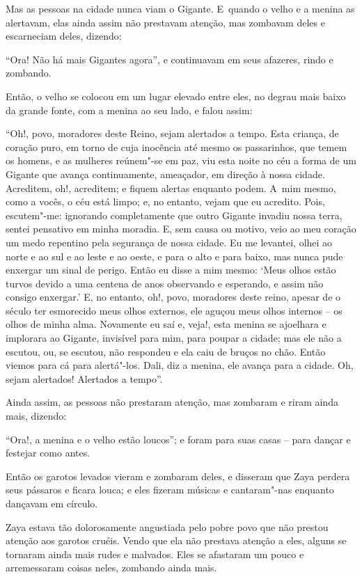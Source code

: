 Mas as pessoas na cidade nunca viam o Gigante. E~quando o velho e a
menina as alertavam, elas ainda assim não prestavam atenção, mas
zombavam deles e escarneciam deles, dizendo:

``Ora! Não há mais Gigantes agora'', e continuavam em seus afazeres,
rindo e zombando.

Então, o velho se colocou em um lugar elevado entre eles, no degrau mais
baixo da grande fonte, com a menina ao seu lado, e falou assim:

``Oh!, povo, moradores deste Reino, sejam alertados a tempo. Esta
criança, de coração puro, em torno de cuja inocência até mesmo os
passarinhos, que temem os homens, e as mulheres reúnem"-se em paz, viu
esta noite no céu a forma de um Gigante que avança continuamente,
ameaçador, em direção à nossa cidade. Acreditem, oh!, acreditem; e
fiquem alertas enquanto podem. A~mim mesmo, como a vocês, o céu está
limpo; e, no entanto, vejam que eu acredito. Pois, escutem"-me: ignorando
completamente que outro Gigante invadiu nossa terra, sentei pensativo em
minha moradia. E, sem causa ou motivo, veio ao meu coração um medo
repentino pela segurança de nossa cidade. Eu me levantei, olhei ao norte
e ao sul e ao leste e ao oeste, e para o alto e para baixo, mas nunca
pude enxergar um sinal de perigo. Então eu disse a mim mesmo: `Meus
olhos estão turvos devido a uma centena de anos observando e esperando,
e assim não consigo enxergar.' E, no entanto, oh!, povo, moradores deste
reino, apesar de o século ter esmorecido meus olhos externos, ele aguçou
meus olhos internos -- os olhos de minha alma. Novamente eu saí e,
veja!, esta menina se ajoelhara e implorara ao Gigante, invisível para
mim, para poupar a cidade; mas ele não a escutou, ou, se escutou, não
respondeu e ela caiu de bruços no chão. Então viemos para cá para
alertá"-los. Dali, diz a menina, ele avança para a cidade. Oh, sejam
alertados! Alertados a tempo''.

Ainda assim, as pessoas não prestaram atenção, mas zombaram e riram
ainda mais, dizendo:

``Ora!, a menina e o velho estão loucos''; e foram para suas casas --
para dançar e festejar como antes.

Então os garotos levados vieram e zombaram deles, e disseram que Zaya
perdera seus pássaros e ficara louca; e eles fizeram músicas e
cantaram"-nas enquanto dançavam em círculo.

Zaya estava tão dolorosamente angustiada pelo pobre povo que não prestou
atenção aos garotos cruéis. Vendo que ela não prestava atenção a eles,
alguns se tornaram ainda mais rudes e malvados. Eles se afastaram um
pouco e arremessaram coisas neles, zombando ainda mais.

